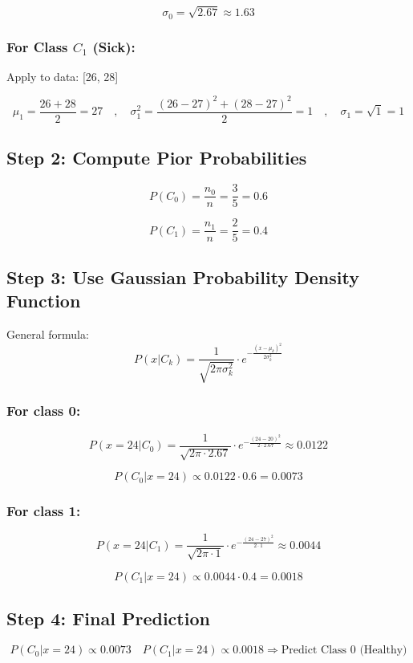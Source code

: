 \documentclass{article}
\begin{document}
$$
\sigma_0 = \sqrt{2.67} \approx 1.63
$$

\subsubsection*{For Class $ C_1 $ (Sick):}
Apply to data: [26, 28]

$$
\mu _1 = \frac{26 + 28}{2} = 27
\quad , \quad
\sigma _1^2 = \frac{(26 - 27)^2 + (28 - 27)^2}{2} = 1
\quad , \quad
\sigma _1 = \sqrt{1} = 1
$$

\subsection*{Step 2: Compute Pior Probabilities}

$$
P(C_0) = \frac{n_0}{n} = \frac{3}{5} = 0.6
$$

$$
P(C_1) = \frac{n_1}{n} = \frac{2}{5} = 0.4
$$

\subsection*{Step 3: Use Gaussian Probability Density Function}

General formula:
$$
P(x|C_k) = \frac{1}{\sqrt{2\pi \sigma_k^2}} \cdot e^{-\frac{(x - \mu_k)^2}{2\sigma_k^2}}
$$

\subsubsection*{For class 0:}

$$
P(x=24|C_0) = \frac{1}{\sqrt{2\pi \cdot 2.67}} \cdot e^{-\frac{(24 - 20)^2}{2 \cdot 2.67}} \approx 0.0122
$$

$$
P(C_0|x=24) \propto 0.0122 \cdot 0.6 = 0.0073
$$


\subsubsection*{For class 1:}
$$
P(x=24|C_1) = \frac{1}{\sqrt{2\pi \cdot 1}} \cdot e^{-\frac{(24 - 27)^2}{2 \cdot 1}} \approx 0.0044
$$

$$
P(C_1|x=24) \propto 0.0044 \cdot 0.4 = 0.0018
$$

\subsection*{Step 4: Final Prediction}

$$
P(C_0|x=24) \propto 0.0073 \quad
P(C_1|x=24) \propto 0.0018
\Rightarrow \text{Predict Class 0 (Healthy)}
$$
\end{document}
